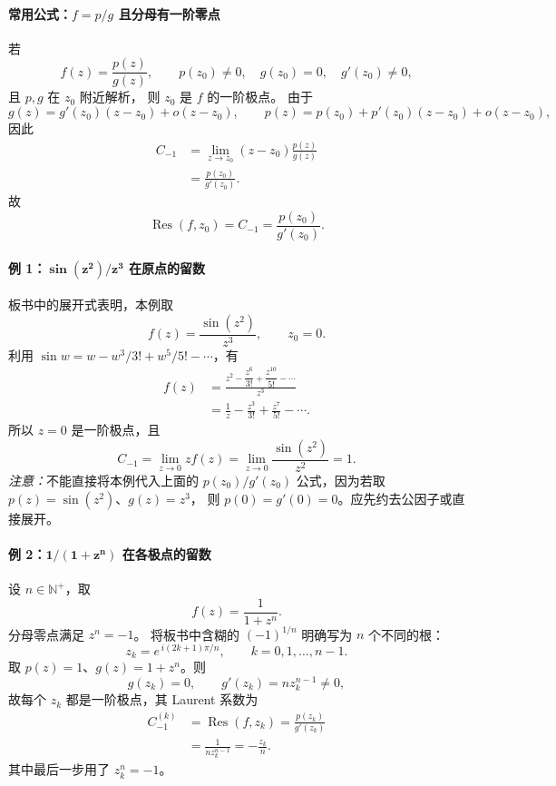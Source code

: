 \paragraph{常用公式：$f=p/g$ 且分母有一阶零点}
若
\[
  f(z)=\frac{p(z)}{g(z)},\qquad
  p(z_0)\ne0,\quad g(z_0)=0,\quad g'(z_0)\ne0,
\]
且 $p,g$ 在 $z_0$ 附近解析，
则 $z_0$ 是 $f$ 的一阶极点。
由于
\[
  g(z)=g'(z_0)(z-z_0)+o(z-z_0),
  \qquad
  p(z)=p(z_0)+p'(z_0)(z-z_0)+o(z-z_0),
\]
因此
\begin{align*}
  C_{-1}
  &=\lim_{z\to z_0}(z-z_0)\frac{p(z)}{g(z)}\\
  &=\frac{p(z_0)}{g'(z_0)}.
\end{align*}
故
\[
  \boxed{\operatorname{Res}(f,z_0)
    =C_{-1}=\frac{p(z_0)}{g'(z_0)}.}
\]

\paragraph{例 1：$\boldsymbol{\sin(z^2)/z^3}$ 在原点的留数}
板书中的展开式表明，本例取
\[
  f(z)=\frac{\sin(z^2)}{z^3},\qquad z_0=0.
\]
利用 $\sin w=w-w^3/3!+w^5/5!-\cdots$，有
\begin{align*}
  f(z)
  &=\frac{z^2-\dfrac{z^6}{3!}
                +\dfrac{z^{10}}{5!}-\cdots}{z^3}\\
  &=\frac1z-\frac{z^3}{3!}+\frac{z^7}{5!}-\cdots.
\end{align*}
所以 $z=0$ 是一阶极点，且
\[
  \boxed{C_{-1}
  =\lim_{z\to0}z f(z)
  =\lim_{z\to0}\frac{\sin(z^2)}{z^2}
  =1.}
\]
\emph{注意：}不能直接将本例代入上面的
$p(z_0)/g'(z_0)$ 公式，因为若取
$p(z)=\sin(z^2)$、$g(z)=z^3$，
则 $p(0)=g'(0)=0$。应先约去公因子或直接展开。

\paragraph{例 2：$\boldsymbol{1/(1+z^n)}$ 在各极点的留数}
设 $n\in\mathbb N^+$，取
\[
  f(z)=\frac{1}{1+z^n}.
\]
分母零点满足 $z^n=-1$。
将板书中含糊的 $(-1)^{1/n}$ 明确写为 $n$ 个不同的根：
\[
  \boxed{z_k=e^{\,i(2k+1)\pi/n},
    \qquad k=0,1,\ldots,n-1.}
\]
取 $p(z)=1$、$g(z)=1+z^n$。则
\[
  g(z_k)=0,\qquad g'(z_k)=nz_k^{n-1}\ne0,
\]
故每个 $z_k$ 都是一阶极点，其 Laurent 系数为
\begin{align*}
  C_{-1}^{(k)}
  &=\operatorname{Res}(f,z_k)
   =\frac{p(z_k)}{g'(z_k)}\\
  &=\frac{1}{n z_k^{n-1}}
   =-\frac{z_k}{n}.
\end{align*}
其中最后一步用了 $z_k^n=-1$。


